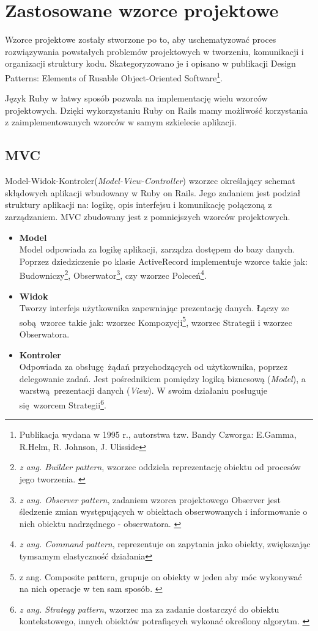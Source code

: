 \section{Zastosowane wzorce projektowe}
\label{sec:patterns}
Wzorce projektowe zostały stworzone po to, aby uschematyzować proces rozwiązywania powstałych problemów projektowych w tworzeniu, komunikacji i organizacji struktury kodu. Skategoryzowano je i opisano w publikacji Design Patterns: Elements of Rusable Object-Oriented Software\footnote{Publikacja wydana w 1995 r., autorstwa tzw. Bandy Czworga: E.Gamma, R.Helm, R. Johnson, J. Ulisside}.

Język Ruby w łatwy sposób pozwala na implementację wielu wzorców projektowych. Dzięki wykorzystaniu Ruby on Rails mamy możliwość korzystania z zaimplementowanych wzorców w samym szkielecie aplikacji.
  \subsection{MVC}
   Model-Widok-Kontroler(\emph{Model-View-Controller}) wzorzec określający schemat skłądowych aplikacji wbudowany w Ruby on Rails. Jego zadaniem jest podział struktury aplikacji na: logikę, opis interfejsu i komunikację połączoną z zarządzaniem.
   MVC zbudowany jest z pomniejszych wzorców projektowych.
    \begin{itemize}
      \item \textbf {Model} \\
      Model odpowiada za logikę aplikacji, zarządza dostępem do bazy danych.
      Poprzez dziedziczenie po klasie ActiveRecord implementuje wzorce takie jak: Budowniczy\footnote{\emph{z ang. Builder pattern}, wzorzec oddziela reprezentację obiektu od procesów jego tworzenia. \cite{ruby_patterns}}, Obserwator\footnote{\emph{z ang. Observer pattern}, zadaniem wzorca projektowego Observer jest śledzenie zmian występujących w obiektach obserwowanych i informowanie o nich obiektu nadrzędnego - obserwatora. \cite{ruby_patterns}}, czy wzorzec Poleceń\footnote{\emph{z ang. Command pattern}, reprezentuje on zapytania jako obiekty, zwiększając tymsamym elastyczność działania\cite{ruby_patterns}}.

      \item \textbf {Widok} \\
      Tworzy interfejs użytkownika zapewniając prezentację danych. Łączy ze sobą wzorce takie jak: wzorzec Kompozycji\footnote{z ang. Composite pattern, grupuje on obiekty w jeden aby móc wykonywać na nich operacje w ten sam sposób. \cite{ruby_patterns}}, wzorzec Strategii i wzorzec Obserwatora.

      \item \textbf {Kontroler} \\
      Odpowiada za obsługę żądań przychodzących od użytkownika, poprzez delegowanie zadań. Jest pośrednikiem pomiędzy logiką biznesową (\emph{Model}), a warstwą prezentacji danych (\emph{View}). W swoim działaniu posługuje się wzorcem Strategii\footnote{ \emph{z ang. Strategy pattern}, wzorzec ma za zadanie dostarczyć do obiektu kontekstowego, innych obiektów potrafiących wykonać określony algorytm. \cite{ruby_patterns}}.
    \end{itemize}

